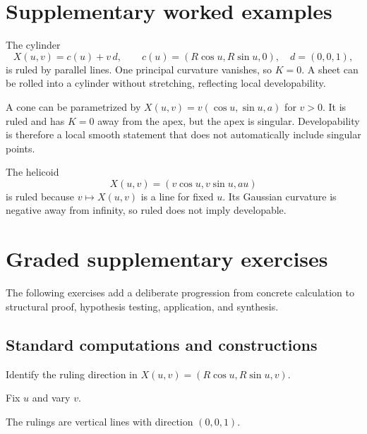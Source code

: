 \section{Supplementary worked examples}
\label{sec:vii18-pedagogy}

\begin{example}\label{ex:vii18-ped-01}
The cylinder
\[
X(u,v)=c(u)+v\,d,\qquad c(u)=(R\cos u,R\sin u,0),\quad d=(0,0,1),
\]
is ruled by parallel lines.  One principal curvature vanishes, so \(K=0\).  A sheet can be rolled into a cylinder without stretching, reflecting local developability.
\end{example}

\begin{example}\label{ex:vii18-ped-02}
A cone can be parametrized by \(X(u,v)=v(\cos u,\sin u,a)\) for \(v>0\).  It is ruled and has \(K=0\) away from the apex, but the apex is singular.  Developability is therefore a local smooth statement that does not automatically include singular points.
\end{example}

\begin{example}\label{ex:vii18-ped-03}
The helicoid
\[
X(u,v)=(v\cos u,v\sin u,au)
\]
is ruled because \(v\mapsto X(u,v)\) is a line for fixed \(u\).  Its Gaussian curvature is negative away from infinity, so ruled does not imply developable.
\end{example}

\section{Graded supplementary exercises}
The following exercises add a deliberate progression from concrete calculation to structural proof, hypothesis testing, application, and synthesis.

\subsection*{Standard computations and constructions}

\begin{exercise}\label{exr:vii18-ped-01}
Identify the ruling direction in \(X(u,v)=(R\cos u,R\sin u,v)\).
\end{exercise}
\begin{hint}
Fix \(u\) and vary \(v\).
\end{hint}
\begin{solution}
The rulings are vertical lines with direction \((0,0,1)\).
\end{solution}


